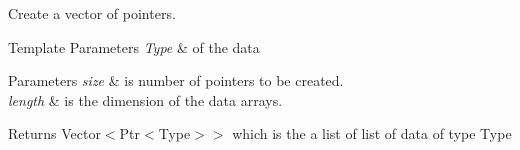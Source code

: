 Create a vector of pointers. 


\begin{DoxyTemplParams}{Template Parameters}
{\em Type} & of the data \\
\hline
\end{DoxyTemplParams}

\begin{DoxyParams}{Parameters}
{\em size} & is number of pointers to be created. \\
\hline
{\em length} & is the dimension of the data arrays. \\
\hline
\end{DoxyParams}
\begin{DoxyReturn}{Returns}
Vector$<$Ptr$<$\+Type$>$$>$ which is the a list of list of data of type Type 
\end{DoxyReturn}
